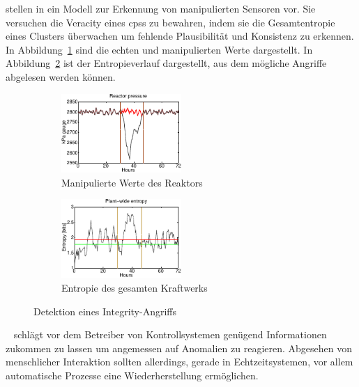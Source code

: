 \documentclass[final,bibliography=totocnumbered]{include/sikseminar}
\newcommand{\cps}{\glspl{cps}\xspace}
\begin{document}
    \citeauthor{KLG15} stellen in \cite{KLG15} ein Modell zur Erkennung von manipulierten Sensoren vor.
    Sie versuchen die Veracity eines \cps zu bewahren, indem sie die Gesamtentropie eines Clusters überwachen um fehlende Plausibilität und Konsistenz zu erkennen.
    In Abbildung~\ref{fig:spoof} sind die echten und manipulierten Werte dargestellt.
    In Abbildung~\ref{fig:entropy_success} ist der Entropieverlauf dargestellt, aus dem mögliche Angriffe abgelesen werden können.
    \begin{figure}
        \centering
        \begin{subfigure}[t]{0.4\textwidth}
            \includegraphics[height=3cm]{entropy_a}
            \caption{Manipulierte Werte des Reaktors}
            \label{fig:spoof}
        \end{subfigure}
        \begin{subfigure}[t]{0.4\textwidth}
            \includegraphics[height=3cm]{entropy_b}
            \caption{Entropie des gesamten Kraftwerks}
            \label{fig:entropy_success}
        \end{subfigure}
        \caption{Detektion eines Integrity-Angriffs~\cite{KLG15}}
        \label{fig:entropie}
    \end{figure}

    \citeauthor{CAS+09}~\cite{CAS+09} schlägt vor dem Betreiber von Kontrollsystemen genügend Informationen zukommen zu lassen um angemessen auf Anomalien zu reagieren.
    Abgesehen von menschlicher Interaktion sollten allerdings, gerade in Echtzeitsystemen, vor allem automatische Prozesse eine Wiederherstellung ermöglichen.
\end{document}
